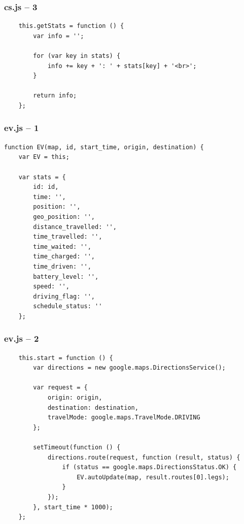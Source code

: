 \begin{frame}[fragile]
\frametitle{cs.js – 3}

\begin{verbatim}
    this.getStats = function () {
        var info = '';

        for (var key in stats) {
            info += key + ': ' + stats[key] + '<br>';
        }

        return info;
    };
\end{verbatim}

\end{frame}
\clearpage



\begin{frame}[fragile]
\frametitle{ev.js – 1}

\begin{verbatim}
function EV(map, id, start_time, origin, destination) {
    var EV = this;

    var stats = {
        id: id,
        time: '',
        position: '',
        geo_position: '',
        distance_travelled: '',
        time_travelled: '',
        time_waited: '',
        time_charged: '',
        time_driven: '',
        battery_level: '',
        speed: '',
        driving_flag: '',
        schedule_status: ''
    };
\end{verbatim}

\end{frame}
\clearpage



\begin{frame}[fragile]
\frametitle{ev.js – 2}

\begin{verbatim}
    this.start = function () {
        var directions = new google.maps.DirectionsService();

        var request = {
            origin: origin,
            destination: destination,
            travelMode: google.maps.TravelMode.DRIVING
        };

        setTimeout(function () {
            directions.route(request, function (result, status) {
                if (status == google.maps.DirectionsStatus.OK) {
                    EV.autoUpdate(map, result.routes[0].legs);
                }
            });
        }, start_time * 1000);
    };
\end{verbatim}

\end{frame}
\clearpage



